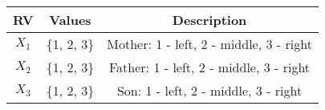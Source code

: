 
\begin{center}
\begin{tabular}{|c|c|c|}
\hline
\textbf{RV}& \textbf{Values} & \textbf{Description} \\ \hline
$X_1$		   & 	\{1, 2, 3\}	&  Mother: 1 - left, 2 - middle, 3 - right\\ \hline
$X_2$		   & 	\{1, 2, 3\}	&  Father: 1 - left, 2 - middle, 3 - right\\ \hline
$X_3$		   & 	\{1, 2, 3\}	&  Son: 1 - left, 2 - middle, 3 - right\\ \hline
\end{tabular}
\end{center}
